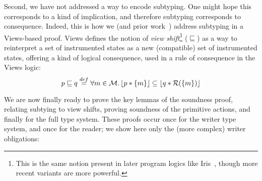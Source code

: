 Second, we have not addressed a way to encode subtyping.  One might hope this corresponds to a kind of implication, and therefore subtyping corresponds to consequence.  Indeed, this is how we (and prior work~\cite{oopsla12,toplas17}) address subtyping in a Views-based proof.
Views defines the notion of \emph{view shift}\footnote{This is the same notion present in later program logics like Iris~\cite{krebbers2017essence}, though more recent variants are more powerful.} ($\sqsubseteq$) as a way to reinterpret a set of instrumented states as a new (compatible) set of instrumented states, offering a kind of logical consequence, used in a rule of consequence in the Views logic:
\[ p \sqsubseteq q \stackrel{def}{=} \forall m\in\mathcal{M} \ldotp \lfloor p * \{ m \} \rfloor \subseteq \lfloor q* \mathcal{R}(\{m\})\rfloor\]

We are now finally ready to prove the key lemmas of the soundness proof, relating subtying to view shifts, proving soundness of the primitive actions, and finally for the full type system.  These proofs occur once for the writer type system, and once for the reader; we show here only the (more complex) writer obligations:

